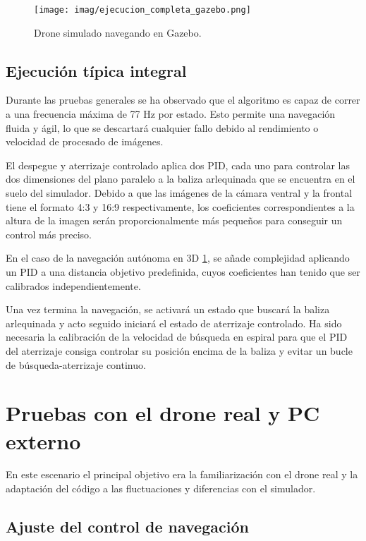\begin{figure}[H]
	\begin{center}
		\texttt{[image: imag/ejecucion\_completa\_gazebo.png]}
		\caption{Drone simulado navegando en Gazebo.}
		\label{fig:simulado_navegacion}	
	\end{center}
\end{figure}

\subsection{Ejecución típica integral}

Durante las pruebas generales se ha observado que el algoritmo es capaz de correr a una frecuencia máxima de 77 Hz por estado. Esto permite una navegación fluida y ágil, lo que se descartará cualquier fallo debido al rendimiento o velocidad de procesado de imágenes.

El despegue y aterrizaje controlado aplica dos PID, cada uno para controlar las dos dimensiones del plano paralelo a la baliza arlequinada que se encuentra en el suelo del simulador. Debido a que las imágenes de la cámara ventral y la frontal tiene el formato 4:3 y 16:9 respectivamente, los coeficientes correspondientes a la altura de la imagen serán proporcionalmente más pequeños para conseguir un control más preciso.

En el caso de la navegación autónoma en 3D \ref{fig:simulado_navegacion}, se añade complejidad aplicando un PID a una distancia objetivo predefinida, cuyos coeficientes han tenido que ser calibrados independientemente. 


Una vez termina la navegación, se activará un estado que buscará la baliza arlequinada y acto seguido iniciará el estado de aterrizaje controlado. Ha sido necesaria la calibración de la velocidad de búsqueda en espiral para que el PID del aterrizaje consiga controlar su posición encima de la baliza y evitar un bucle de búsqueda-aterrizaje continuo.

\section{Pruebas con el drone real y PC externo}

En este escenario el principal objetivo era la familiarización con el drone real y la adaptación del código a las fluctuaciones y diferencias con el simulador.

\subsection{Ajuste del control de navegación}

